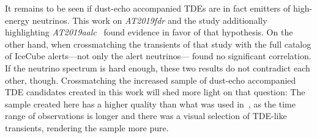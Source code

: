 It remains to be seen if dust-echo accompanied TDEs are in fact emitters of high-energy neutrinos. This work on \textit{AT2019fdr} and the study additionally highlighting \textit{AT2019aalc}~\cite{Velzen2021} found evidence in favor of that hypothesis. On the other hand, when crossmatching the transients of that study with the full catalog of IceCube alerts---not only the alert neutrinos--- found no significant correlation. If the neutrino spectrum is hard enough, these two results do not contradict each other, though. Crossmatching the increased sample of dust-echo accompanied TDE candidates created in this work will shed more light on that question: The sample created here has a higher quality than what was used in~\cite{Velzen2021}, as the time range of observations is longer and there was a visual selection of TDE-like transients, rendering the sample more pure.












